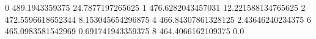 0 489.1943359375 24.7877197265625
1 476.6282043457031 12.221588134765625
2 472.5596618652344 8.153045654296875
4 466.84307861328125 2.43646240234375
6 465.0983581542969 0.691741943359375
8 464.4066162109375 0.0
